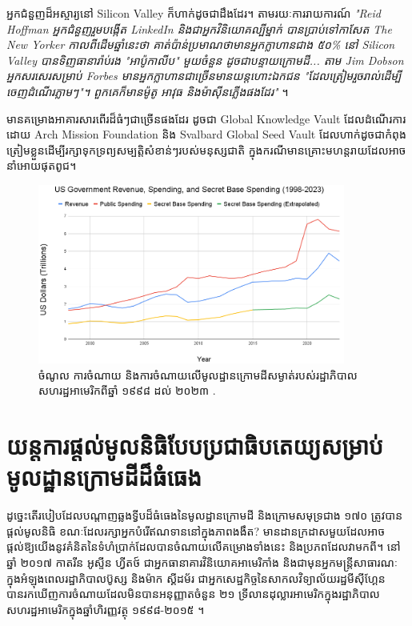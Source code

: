 \documentclass[10pt,twocolumn,letterpaper]{article}
\begin{document}
អ្នកជំនួញដ៏អស្ចារ្យនៅ Silicon Valley ក៏ហាក់ដូចជាដឹងដែរ។ តាមរយៈការរាយការណ៍ \textit{"Reid Hoffman អ្នកជំនួញរួមបង្កើត LinkedIn និងជាអ្នកវិនិយោគល្បីម្នាក់ បានប្រាប់ទៅកាសែត The New Yorker កាលពីដើមឆ្នាំនេះថា គាត់ប៉ាន់ប្រមាណថាមានអ្នកក្លាហានជាង ៥០\% នៅ Silicon Valley បានទិញធានារ៉ាប់រង "អាប៉ូកាលីប" មួយចំនួន ដូចជាបន្ទាយក្រោមដី... តាម Jim Dobson អ្នកសរសេរសម្រាប់ Forbes មានអ្នកក្លាហានជាច្រើនមានយន្តហោះឯកជន "ដែលត្រៀមរួចរាល់ដើម្បីចេញដំណើរភ្លាមៗ"។ ពួកគេក៏មានម៉ូតូ អាវុធ និងម៉ាស៊ីនភ្លើងផងដែរ"} \cite{28}។

មានគម្រោងអាគារសារពើរដ៏ធំៗជាច្រើនផងដែរ ដូចជា Global Knowledge Vault ដែលដំណើរការដោយ Arch Mission Foundation \cite{29} និង Svalbard Global Seed Vault \cite{30} ដែលហាក់ដូចជាកំពុងត្រៀមខ្លួនដើម្បីរក្សាទុកទ្រព្យសម្បត្តិសំខាន់ៗរបស់មនុស្សជាតិ ក្នុងករណីមានគ្រោះមហន្តរាយដែលអាចនាំអោយផុតពូជ។
\begin{figure}[t]
\begin{center}
\includegraphics[width=0.9\textwidth]{govcrop2.png}
\end{center}
   \caption{ចំណូល ការចំណាយ និងការចំណាយលើមូលដ្ឋានក្រោមដីសម្ងាត់របស់រដ្ឋាភិបាលសហរដ្ឋអាមេរិកពីឆ្នាំ ១៩៩៨ ដល់ ២០២៣ \cite{19}.}
   \label{fig:9}
\end{figure}
\section{យន្តការផ្តល់មូលនិធិបែបប្រជាធិបតេយ្យសម្រាប់មូលដ្ឋានក្រោមដីដ៏ធំធេង}

ដូច្នេះតើរបៀបដែលបណ្តាញឆ្លងទ្វីបដ៏ធំធេងនៃមូលដ្ឋានក្រោមដី និងក្រោមសមុទ្រជាង ១៧០ ត្រូវបានផ្តល់មូលនិធិ ខណៈដែលរក្សាអ្នកបំរើឥណទាននៅក្នុងភាពងងឹត? មានដានក្រដាសមួយដែលអាចផ្តល់ឱ្យយើងនូវគំនិតនៃទំហំប្រាក់ដែលបានចំណាយលើគម្រោងទាំងនេះ និងប្រភពដែលវាមកពី។ នៅឆ្នាំ ២០១៧ កាតរីន អូស្ទីន ហ្វីតថ៍ ជាអ្នកធានាគារវិនិយោគអាមេរិកាំង និងជាមុនអ្នកមន្ត្រីសាធារណៈក្នុងអំឡុងពេលរដ្ឋាភិបាលប៊ូស្ស និងម៉ាក ស្គីដម័រ ជាអ្នកសេដ្ឋកិច្ចនៃសាកលវិទ្យាល័យរដ្ឋមីស៊ីហ្គែន បានរកឃើញការចំណាយដែលមិនបានអនុញ្ញាតចំនួន ២១ ទ្រីលានដុល្លារអាមេរិកក្នុងរដ្ឋាភិបាលសហរដ្ឋអាមេរិកក្នុងឆ្នាំហិរញ្ញវត្ថុ ១៩៩៨-២០១៥ \cite{11,12,13}។
\end{document}
